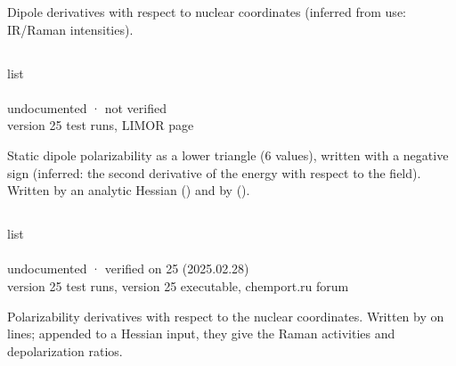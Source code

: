 \documentclass[letterpaper,10pt,english,openany,oneside]{sphinxmanual}
\begin{document}
\sphinxAtStartPar
Dipole derivatives with respect to nuclear coordinates (inferred from use: IR/Raman intensities).


\subsection{}
\label{\detokenize{reference/Energy:a}}\label{\detokenize{reference/Energy:energy-a}}
\ignorespaces 
\sphinxAtStartPar
{} list\\
 \\
 undocumented · not verified\\
 version 25 test runs, LIMOR page

\sphinxAtStartPar
Static dipole polarizability as a lower triangle (6 values), written with a negative sign (inferred: the
second derivative of the energy with respect to the field). Written by an analytic Hessian () and by
 ().

\sphinxAtStartPar
{} {\hyperref[\detokenize{reference/Energy:energy-ax}]{}}


\subsection{}
\label{\detokenize{reference/Energy:ax}}\label{\detokenize{reference/Energy:energy-ax}}
\ignorespaces 
\sphinxAtStartPar
{} list\\
 \\
 undocumented · verified on 25 (2025.02.28)\\
 version 25 test runs, version 25 executable, chemport.ru forum

\sphinxAtStartPar
Polarizability derivatives with respect to the nuclear coordinates. Written by  on  lines;
appended to a Hessian input, they give the Raman activities and depolarization ratios.
\end{document}
